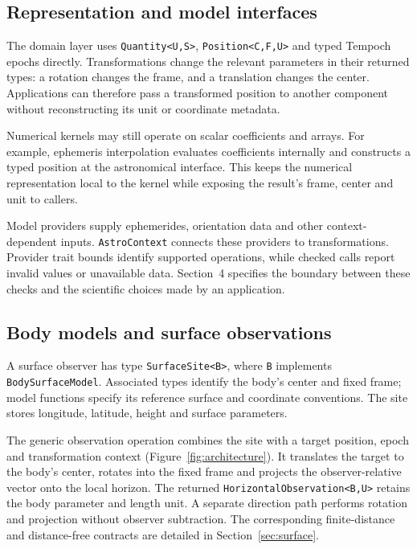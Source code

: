 \subsection{Representation and model interfaces}

The domain layer uses \texttt{Quantity<U,S>}, \texttt{Position<C,F,U>} and typed Tempoch epochs
directly. Transformations change the relevant parameters in their returned types: a rotation
changes the frame, and a translation changes the center. Applications can therefore pass a
transformed position to another component without reconstructing its unit or coordinate metadata.

Numerical kernels may still operate on scalar coefficients and arrays. For example, ephemeris
interpolation evaluates coefficients internally and constructs a typed position at the astronomical
interface. This keeps the numerical representation local to the kernel while exposing the result's
frame, center and unit to callers.

Model providers supply ephemerides, orientation data and other context-dependent inputs.
\texttt{AstroContext} connects these providers to transformations. Provider trait bounds identify
supported operations, while checked calls report invalid values or unavailable data. Section~4
specifies the boundary between these checks and the scientific choices made by an application.

\subsection{Body models and surface observations}

A surface observer has type \texttt{SurfaceSite<B>}, where \texttt{B} implements
\texttt{BodySurfaceModel}. Associated types identify the body's center and fixed frame; model
functions specify its reference surface and coordinate conventions. The site stores longitude,
latitude, height and surface parameters.

The generic observation operation combines the site with a target position, epoch and
transformation context (Figure~\ref{fig:architecture}). It translates the target to the body's
center, rotates into the fixed frame and projects the observer-relative vector onto the local
horizon. The returned \texttt{HorizontalObservation<B,U>} retains the body parameter and length
unit. A separate direction path performs rotation and projection without observer subtraction. The
corresponding finite-distance and distance-free contracts are detailed in
Section~\ref{sec:surface}.

